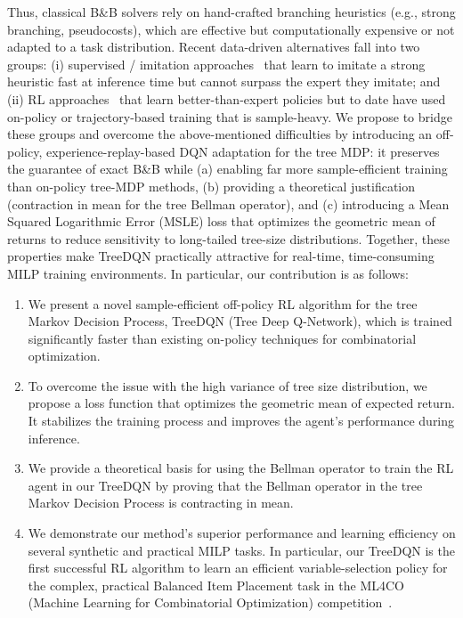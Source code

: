 \documentclass[preprint,12pt]{elsarticle} %
\theoremstyle{plain}
\theoremstyle{definition}
\theoremstyle{remark}
\begin{document}
Thus, classical B\&B solvers rely on hand-crafted branching heuristics (e.g., strong branching, pseudocosts), which are effective but computationally expensive or not adapted to a task distribution. Recent data-driven alternatives fall into two groups: (i) supervised / imitation approaches~\cite{gasse_2019} that learn to imitate a strong heuristic fast at inference time but cannot surpass the expert they imitate; and (ii) RL approaches~\cite{scavuzzo_2022} that learn better-than-expert policies but to date have used on-policy or trajectory-based training that is sample-heavy. We propose to bridge these groups and overcome the above-mentioned difficulties by introducing an off-policy, experience-replay-based DQN adaptation for the tree MDP: it preserves the guarantee of exact B\&B while (a) enabling far more sample-efficient training than on-policy tree-MDP methods, (b) providing a theoretical justification (contraction in mean for the tree Bellman operator), and (c) introducing a Mean Squared Logarithmic Error (MSLE) loss that optimizes the geometric mean of returns to reduce sensitivity to long-tailed tree-size distributions. Together, these properties make TreeDQN practically attractive for real-time, time-consuming MILP training environments. 
In particular, our contribution is as follows:

\begin{enumerate}
    \item We present a novel sample-efficient off-policy RL algorithm for the tree Markov Decision Process, TreeDQN (Tree Deep Q-Network), which is trained significantly faster than existing on-policy techniques for combinatorial optimization.  
    \item To overcome the issue with the high variance of tree size distribution, we propose a loss function that optimizes the geometric mean of expected return. It stabilizes the training process and improves the agent's performance during inference. 
    \item We provide a theoretical basis for using the Bellman operator to train the RL agent in our TreeDQN by proving that the Bellman operator in the tree Markov Decision Process is contracting in mean.
    \item We demonstrate our method's superior performance and learning efficiency on several synthetic and practical MILP tasks. In particular, our TreeDQN is the first successful RL algorithm to learn an efficient variable-selection policy for the complex, practical Balanced Item Placement task in the ML4CO (Machine Learning for Combinatorial Optimization) competition~\cite{ml4co}. 
\end{enumerate}
\end{document}
